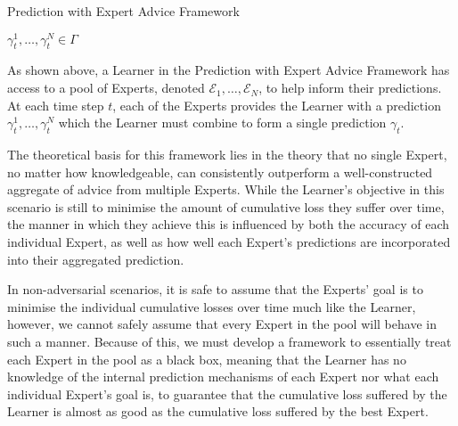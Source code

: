 \begin{protocol}[ht]
    \caption{Prediction with Expert Advice Framework}\label{protocol:prediction_with_expert_advice}
    \begin{algorithmic}[1]
        $\gamma^1_t, \ldots, \gamma^N_t \in \Gamma$
    \end{algorithmic}
\end{protocol}

As shown above, a Learner in the Prediction with Expert Advice Framework has access to a pool of Experts, denoted $\mathcal{E}_1, \ldots, \mathcal{E}_N$, to help inform their predictions. At each time step $t$, each of the Experts provides the Learner with a prediction $\gamma^1_t, \ldots, \gamma^N_t$ which the Learner must combine to form a single prediction $\gamma_t$.

The theoretical basis for this framework lies in the theory that no single Expert, no matter how knowledgeable, can consistently outperform a well-constructed aggregate of advice from multiple Experts. While the Learner's objective in this scenario is still to minimise the amount of cumulative loss they suffer over time, the manner in which they achieve this is influenced by both the accuracy of each individual Expert, as well as how well each Expert's predictions are incorporated into their aggregated prediction.

In non-adversarial scenarios, it is safe to assume that the Experts' goal is to minimise the individual cumulative losses over time much like the Learner, however, we cannot safely assume that every Expert in the pool will behave in such a manner. Because of this, we must develop a framework to essentially treat each Expert in the pool as a black box, meaning that the Learner has no knowledge of the internal prediction mechanisms of each Expert nor what each individual Expert's goal is, to guarantee that the cumulative loss suffered by the Learner is almost as good as the cumulative loss suffered by the best Expert.


